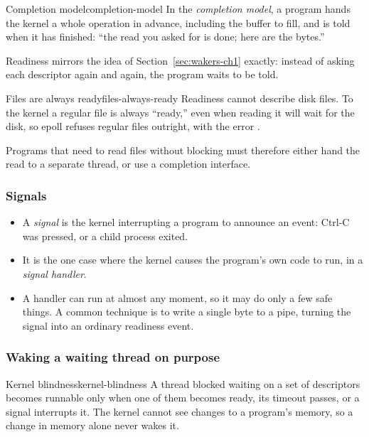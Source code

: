 \begin{definition}{Completion model}{completion-model}
    In the \emph{completion model}, a program hands the kernel a whole operation in advance, including the buffer to fill, and is told when it has finished: ``the read you asked for is done; here are the bytes.''
\end{definition}

Readiness mirrors the idea of Section~\ref{sec:wakers-ch1} exactly: instead of asking each descriptor again and again, the program waits to be told.

\begin{axiom}{Files are always ready}{files-always-ready}
    Readiness cannot describe disk files. To the kernel a regular file is always ``ready,'' even when reading it will wait for the disk, so epoll refuses regular files outright, with the error .
\end{axiom}

Programs that need to read files without blocking must therefore either hand the read to a separate thread, or use a completion interface.

\subsubsection{Signals}

\begin{itemize}
    \item A \emph{signal} is the kernel interrupting a program to announce an event: Ctrl-C was pressed, or a child process exited.
    \item It is the one case where the kernel causes the program's own code to run, in a \emph{signal handler}.
    \item A handler can run at almost any moment, so it may do only a few safe things. A common technique is to write a single byte to a pipe, turning the signal into an ordinary readiness event.
\end{itemize}

\subsubsection{Waking a waiting thread on purpose}

\begin{axiom}{Kernel blindness}{kernel-blindness}
    A thread blocked waiting on a set of descriptors becomes runnable only when one of them becomes ready, its timeout passes, or a signal interrupts it. The kernel cannot see changes to a program's memory, so a change in memory alone never wakes it.
\end{axiom}

